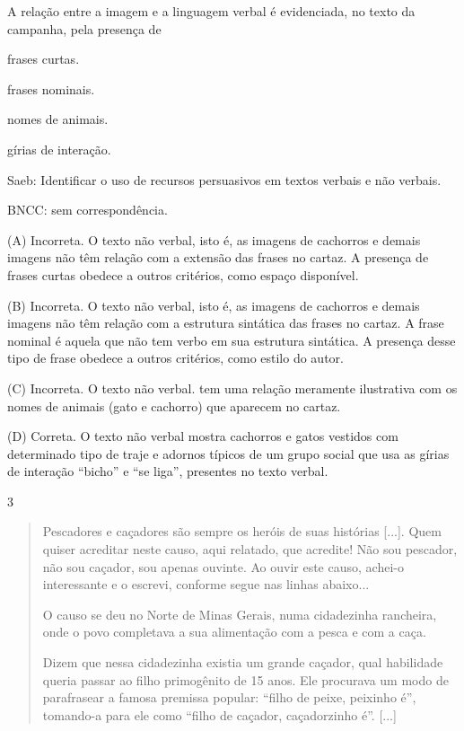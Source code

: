 
A relação entre a imagem e a linguagem verbal é evidenciada, no texto da
campanha, pela presença de

\begin{escolha}
\item frases curtas.

\item frases nominais.

\item nomes de animais.

\item gírias de interação.
\end{escolha}

Saeb: Identificar o uso de recursos persuasivos em textos verbais e não
verbais.

BNCC: sem correspondência.

(A) Incorreta. O texto não verbal, isto é, as imagens de cachorros e
demais imagens não têm relação com a extensão das frases no cartaz. A
presença de frases curtas obedece a outros critérios, como espaço
disponível.

(B) Incorreta. O texto não verbal, isto é, as imagens de cachorros e
demais imagens não têm relação com a estrutura sintática das frases no
cartaz. A frase nominal é aquela que não tem verbo em sua estrutura
sintática. A presença desse tipo de frase obedece a outros critérios,
como estilo do autor.

(C) Incorreta. O texto não verbal. tem uma relação meramente ilustrativa
com os nomes de animais (gato e cachorro) que aparecem no cartaz.

(D) Correta. O texto não verbal mostra cachorros e gatos vestidos com
determinado tipo de traje e adornos típicos de um grupo social que usa
as gírias de interação ``bicho'' e ``se liga'', presentes no texto
verbal.

\num{3}

\begin{quote}
Pescadores e caçadores são sempre os heróis de suas histórias {[}...{]}.
Quem quiser acreditar neste causo, aqui relatado, que acredite! Não sou
pescador, não sou caçador, sou apenas ouvinte. Ao ouvir este causo,
achei-o interessante e o escrevi, conforme segue nas linhas abaixo...

O causo se deu no Norte de Minas Gerais, numa cidadezinha rancheira,
onde o povo completava a sua alimentação com a pesca e com a caça.

Dizem que nessa cidadezinha existia um grande caçador, qual habilidade
queria passar ao filho primogênito de 15 anos. Ele procurava um modo de
parafrasear a famosa premissa popular: ``filho de peixe, peixinho é'',
tomando-a para ele como ``filho de caçador, caçadorzinho é''. {[}...{]}
\end{quote}

